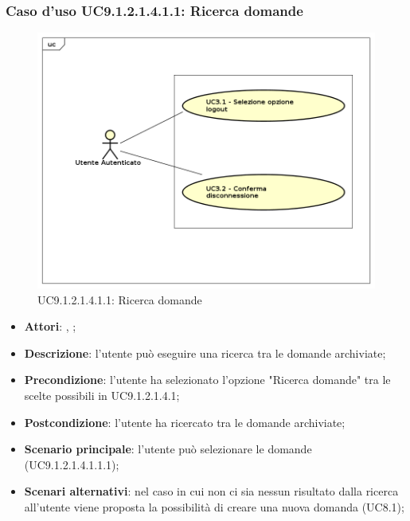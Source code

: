 							\subsubsection{Caso d'uso UC9.1.2.1.4.1.1: Ricerca domande}
							\label{UC9.1.2.1.4.1.1}
							\begin{figure}[h]
								\centering
								\includegraphics[scale=0.5,keepaspectratio]{UML/UC9.png}
								\caption{UC9.1.2.1.4.1.1: Ricerca domande}
							\end{figure}
							\FloatBarrier
							\begin{itemize}
								\item \textbf{Attori}: \uau, \uaupro;
								\item \textbf{Descrizione}: l'utente può eseguire una ricerca tra le domande archiviate; 
								\item \textbf{Precondizione}: l'utente ha selezionato l'opzione "Ricerca domande" tra le scelte possibili in UC9.1.2.1.4.1;
								\item \textbf{Postcondizione}: l'utente ha ricercato tra le domande archiviate;
								\item \textbf{Scenario principale}: l'utente può selezionare le domande (UC9.1.2.1.4.1.1.1); 
								\item \textbf{Scenari alternativi}: nel caso in cui non ci sia nessun risultato dalla ricerca all'utente viene proposta la possibilità di creare una nuova domanda (UC8.1);
							\end{itemize}
							
